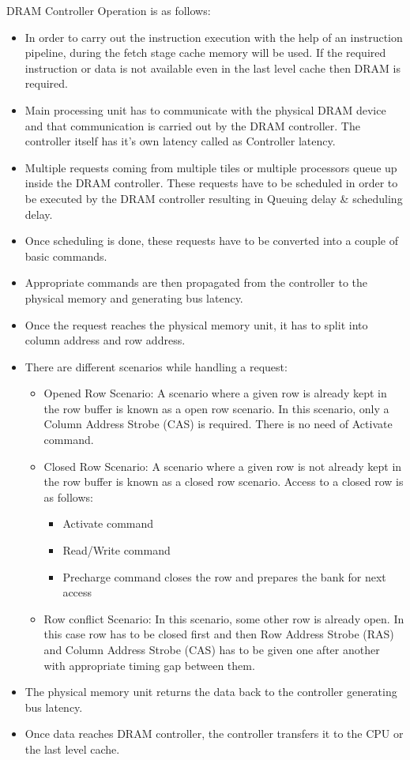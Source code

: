 DRAM Controller Operation is as follows:

\begin{itemize}
    \item In order to carry out the instruction execution with the help of an instruction pipeline, during the fetch stage cache memory will be used. If the required instruction or data is not available even in the last level cache then DRAM is required.
    \item Main processing unit has to communicate with the physical DRAM device and that communication is carried out by the DRAM controller. The controller itself has it's own latency called as Controller latency.
    \item Multiple requests coming from multiple tiles or multiple processors queue up inside the DRAM controller. These requests have to be scheduled in order to be executed by the DRAM controller resulting in Queuing delay \& scheduling delay. 
    \item Once scheduling is done, these requests have to be converted into a couple of basic commands.
    \item Appropriate commands are then propagated from the controller to the physical memory and generating bus latency. 
    \item Once the request reaches the physical memory unit, it has to split into column address and row address.
    \item There are different scenarios while handling a request:
    \begin{itemize}
        \item Opened Row Scenario: A scenario where a given row is already kept in the row buffer is known as a open row scenario. In this scenario, only a Column Address Strobe (CAS) is required. There is no need of Activate command.
        \item Closed Row Scenario: A scenario where a given row is not already kept in the row buffer is known as a closed row scenario. Access to a closed row is as follows:
        \begin{itemize}
            \item Activate command
            \item Read/Write command 
            \item Precharge command closes the row and prepares the bank for next access
        \end{itemize}
        \item Row conflict Scenario: In this scenario, some other row is already open. In this case row has to be closed first and then Row Address Strobe (RAS) and Column Address Strobe (CAS) has to be given one after another with appropriate timing gap between them.
    \end{itemize}
    \item The physical memory unit returns the data back to the controller generating bus latency.
    \item Once data reaches DRAM controller, the controller transfers it to the CPU or the last level cache.
\end{itemize}



